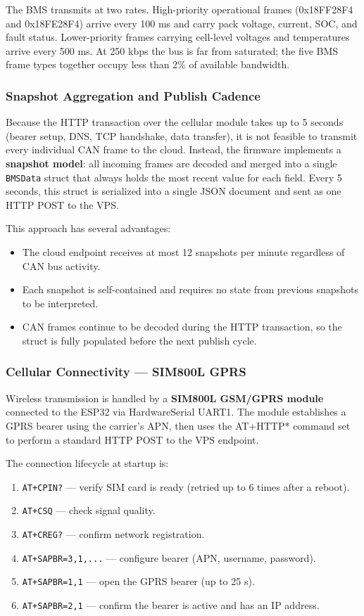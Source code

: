 The BMS transmits at two rates. High-priority operational frames (0x18FF28F4 and 0x18FE28F4) arrive every 100 ms and carry pack voltage, current, SOC, and fault status. Lower-priority frames carrying cell-level voltages and temperatures arrive every 500 ms. At 250 kbps the bus is far from saturated; the five BMS frame types together occupy less than 2\% of available bandwidth.

\subsubsection{Snapshot Aggregation and Publish Cadence}

Because the HTTP transaction over the cellular module takes up to 5 seconds (bearer setup, DNS, TCP handshake, data transfer), it is not feasible to transmit every individual CAN frame to the cloud. Instead, the firmware implements a \textbf{snapshot model}: all incoming frames are decoded and merged into a single \texttt{BMSData} struct that always holds the most recent value for each field. Every 5 seconds, this struct is serialized into a single JSON document and sent as one HTTP POST to the VPS.

This approach has several advantages:
\begin{itemize}
    \item The cloud endpoint receives at most 12 snapshots per minute regardless of CAN bus activity.
    \item Each snapshot is self-contained and requires no state from previous snapshots to be interpreted.
    \item CAN frames continue to be decoded during the HTTP transaction, so the struct is fully populated before the next publish cycle.
\end{itemize}

\subsubsection{Cellular Connectivity — SIM800L GPRS}

Wireless transmission is handled by a \textbf{SIM800L GSM/GPRS module} connected to the ESP32 via HardwareSerial UART1. The module establishes a GPRS bearer using the carrier's APN, then uses the AT+HTTP* command set to perform a standard HTTP POST to the VPS endpoint.

The connection lifecycle at startup is:
\begin{enumerate}
    \item \texttt{AT+CPIN?} — verify SIM card is ready (retried up to 6 times after a reboot).
    \item \texttt{AT+CSQ} — check signal quality.
    \item \texttt{AT+CREG?} — confirm network registration.
    \item \texttt{AT+SAPBR=3,1,...} — configure bearer (APN, username, password).
    \item \texttt{AT+SAPBR=1,1} — open the GPRS bearer (up to 25 s).
    \item \texttt{AT+SAPBR=2,1} — confirm the bearer is active and has an IP address.
\end{enumerate}

